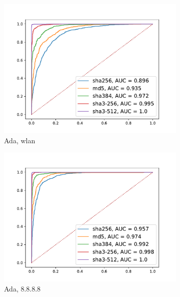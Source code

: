 \documentclass[12pt,a4paper,automark, toc=bib]{scrreprt}
\theoremstyle{definition}
\begin{document}
\begin{figure}
\begin{subfigure}{0.32\linewidth}
					\includegraphics[width=\linewidth]{figures/wlan_50_AdaBoost.pdf}
					\caption{Ada, wlan}
				\end{subfigure}
				\begin{subfigure}{0.32\linewidth}
					\centering
					\includegraphics[width=\linewidth]{figures/8.8.8.8_50_AdaBoost.pdf}
					\caption{Ada, 8.8.8.8}
				\end{subfigure}
				\begin{subfigure}{0.32\linewidth}
					\centering

\end{subfigure}
\end{figure}
\end{document}
